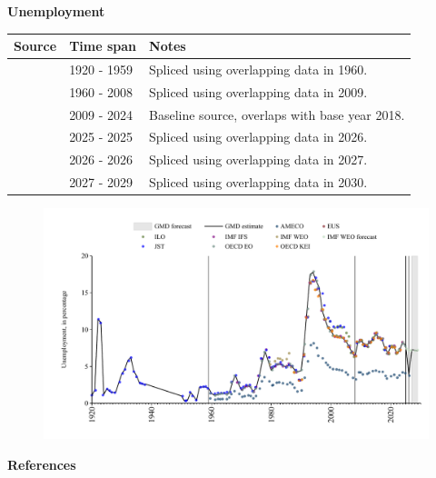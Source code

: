 \documentclass[12pt,a4paper,landscape]{article}
\begin{document}
\begin{adjustbox}{max totalsize={\paperwidth}{\paperheight},center}
\begin{minipage}[t][\textheight][t]{\textwidth}
\vspace*{0.5cm}
{}
\begin{center}
{\Large\bfseries Unemployment}
\end{center}
\vspace{0.5cm}
\begin{table}[H]
\centering
\small
\begin{tabular}{|l|l|l|}
\hline
\textbf{Source} & \textbf{Time span} & \textbf{Notes} \\
\hline
\rowcolor{white}\cite{JST}& 1920 - 1959 &Spliced using overlapping data in 1960. \\
\rowcolor{lightgray}\cite{OECD_EO}& 1960 - 2008 &Spliced using overlapping data in 2009. \\
\rowcolor{white}\cite{EUS}& 2009 - 2024 &Baseline source, overlaps with base year 2018. \\
\rowcolor{lightgray}\cite{OECD_EO}& 2025 - 2025 &Spliced using overlapping data in 2026. \\
\rowcolor{white}\cite{AMECO}& 2026 - 2026 &Spliced using overlapping data in 2027. \\
\rowcolor{lightgray}\cite{IMF_WEO_forecast}& 2027 - 2029 &Spliced using overlapping data in 2030. \\
\hline
\end{tabular}
\end{table}
\begin{figure}[H]
\centering
\includegraphics[width=\textwidth,height=0.6\textheight,keepaspectratio]{graphs/FIN_unemp.pdf}
\end{figure}
\end{minipage}
\end{adjustbox}
{}
\begin{center}
{\Large\bfseries References}
\end{center}
\small


\end{document}
